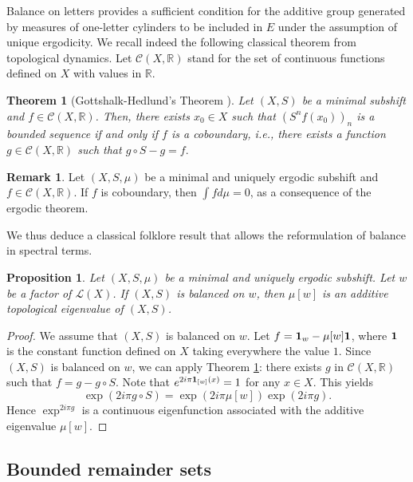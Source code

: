 \documentclass{article}
\newtheorem{theorem}[lemma]{Theorem}
\newtheorem{proposition}[lemma]{Proposition}
\theoremstyle{definition}
\newtheorem{remark}[lemma]{Remark}
\begin{document}
 
 Balance  on letters  provides  a sufficient condition
for  the  additive group generated by  measures of one-letter cylinders to be  included in $E$      under the assumption of unique ergodicity.
We recall  indeed the   following classical   theorem from topological dynamics. Let
 $ {\mathcal C} (X,\mathbb{R})$  stand for the set of continuous functions defined on $X$ with values in ${\mathbb R}$.

\begin{theorem} [Gottshalk-Hedlund's Theorem \cite{Gott.Hed.55}] \label{thm-got}
Let $(X,S)$ be  a minimal  subshift and $f\in {\mathcal C} (X,\mathbb{R})$. 
Then, there exists $x_0\in X$ such that $(S^nf(x_0))_n$ is a bounded sequence if and only if $f$ is a coboundary, i.e.,  there exists a function $g\in   {\mathcal C}(X,\mathbb{R})$ such that $
 g\circ S-g=f.$
\end{theorem}
\begin{remark} \label{rem:int}
Let $(X,S,\mu)$ be  a minimal  and uniquely ergodic  subshift and $f\in {\mathcal C} (X,\mathbb{R})$.  If $f$ is coboundary, then 
$\int  f d\mu=0$,  as a consequence of the ergodic theorem.
\end{remark}

We thus deduce  a classical  folklore result  that allows  the reformulation of balance in spectral terms. 
\begin{proposition}\label{prop-vp}
Let $(X,S,\mu)$ be  a minimal  and uniquely ergodic subshift. Let $w$ be a  factor  of ${\mathcal L}(X)$.
If   $(X,S)$ is  balanced on $w$, then  $\mu[w]$  is an additive  topological   eigenvalue of $(X, S)$.
\end{proposition}
\begin{proof}
We assume that  $(X,S)$ is  balanced on $w$. 
Let $f= {\bf 1}_{w} -   \mu [w] {\bf 1}$, where ${\bf 1}$  is the constant function defined on $X$ taking everywhere the value $1$.
 Since $(X,S)$ is  balanced on $w$,   we can apply  Theorem \ref{thm-got}: there exists $g$ in $ {\mathcal C} (X,\mathbb{R})$ such that 
$f = g - g \circ S$.
Note that $e^{2i\pi {\bf 1}_{[w]}(x)}=1$ for  any $x\in X$.
This yields
$$\exp({2i\pi g\circ S}) = \exp ({2i\pi \mu [w] })  \exp  ({ 2i \pi  g}).$$
Hence  $\exp  ^{ 2i \pi  g}$ is a continuous   eigenfunction    associated with the additive  eigenvalue $\mu [w]$.
\end{proof}





\subsection{Bounded remainder sets}\label{subsec:BRS}
\end{document}
